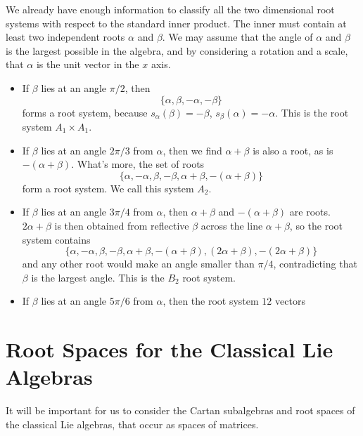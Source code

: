 \begin{example}
    We already have enough information to classify all the two dimensional root systems with respect to the standard inner product. The inner must contain at least two independent roots $\alpha$ and $\beta$. We may assume that the angle of $\alpha$ and $\beta$ is the largest possible in the algebra, and by considering a rotation and a scale, that $\alpha$ is the unit vector in the $x$ axis.
    \begin{itemize}
        \item If $\beta$ lies at an angle $\pi/2$, then
        \[ \{ \alpha, \beta, -\alpha, -\beta \} \]
        forms a root system, because $s_\alpha(\beta) = -\beta$, $s_\beta(\alpha) = -\alpha$. This is the root system $A_1 \times A_1$.

        \item If $\beta$ lies at an angle $2\pi/3$ from $\alpha$, then we find $\alpha + \beta$ is also a root, as is $-(\alpha + \beta)$. What's more, the set of roots
        \[ \{ \alpha, -\alpha, \beta, -\beta, \alpha + \beta, -(\alpha + \beta) \} \]
        form a root system. We call this system $A_2$.

        \item If $\beta$ lies at an angle $3\pi/4$ from $\alpha$, then $\alpha + \beta$ and $-(\alpha + \beta)$ are roots. $2\alpha + \beta$ is then obtained from reflective $\beta$ across the line $\alpha + \beta$, so the root system contains
        \[ \{ \alpha, -\alpha, \beta, -\beta, \alpha + \beta, -(\alpha + \beta), (2\alpha + \beta), -(2\alpha + \beta) \} \]
        and any other root would make an angle smaller than $\pi/4$, contradicting that $\beta$ is the largest angle. This is the $B_2$ root system.

        \item If $\beta$ lies at an angle $5\pi/6$ from $\alpha$, then the root system $12$ vectors
    \end{itemize}
\end{example}





\section{Root Spaces for the Classical Lie Algebras}

It will be important for us to consider the Cartan subalgebras and root spaces of the classical Lie algebras, that occur as spaces of matrices.

